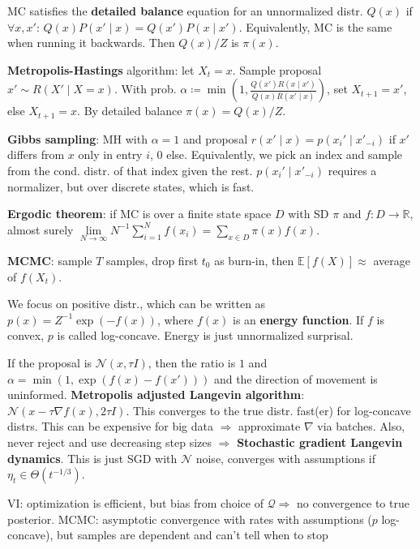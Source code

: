 \documentclass[11pt,landscape,a4paper,fleqn]{article}
\begin{document}
\begin{multicols*}{4}
MC satisfies the \textbf{detailed balance} equation for an unnormalized distr. \(Q(x)\) if \(\forall x, x'\):
\(Q(x)P(x' \mid x) = Q(x')P(x \mid x')\).
Equivalently, MC is the same when running it backwards.
Then \(Q(x) / Z\) is \(\pi(x)\).

\textbf{Metropolis-Hastings} algorithm: let \(X_t = x\).
Sample proposal \(x' \sim R(X' \mid X = x)\).
With prob. \(\alpha \coloneqq \min(1, \frac{Q(x')R(x \mid x')}{Q(x) R(x' \mid x)})\),
set \(X_{t+1} = x'\), else \(X_{t+1} = x\).
By detailed balance \(\pi(x) = Q(x) / Z\).

\textbf{Gibbs sampling}: MH with \(\alpha = 1\) and proposal
\(r(x' \mid x) = p(x_i' \mid x'_{ - i})\) if \(x'\) differs from \(x\) only in entry \(i\), 0 else.
Equivalently, we pick an index and sample from the cond. distr. of that index given the rest.
\(p(x_i' \mid x'_{ - i})\) requires a normalizer, but over discrete states, which is fast.

\textbf{Ergodic theorem}: if MC is over a finite state space \(D\) with SD \(\pi\) and \(f : D \to \mathbb{R}\),
almost surely \(\lim\limits_{N \to \infty} N^{-1} \sum_{i = 1}^N f(x_i) = \sum_{x \in D} \pi(x) f(x)\).

\textbf{MCMC}: sample \(T\) samples, drop first \(t_0\) as burn-in, then \(\mathbb{E}[f(X)] \approx\) average of \(f(X_t)\).

We focus on positive distr., which can be written as \(p(x) = Z^{-1} \exp( - f(x))\), where \(f(x)\) is an \textbf{energy function}.
If \(f\) is convex, \(p\) is called log-concave.
Energy is just unnormalized surprisal.

If the proposal is \(\mathcal{N}(x, \tau I)\), then the ratio is \(1\) and \(\alpha = \min(1, \exp(f(x) - f(x')))\)
and the direction of movement is uninformed.
\textbf{Metropolis adjusted Langevin algorithm}: \(\mathcal{N}(x - \tau \nabla f(x), 2\tau I)\).
This converges to the true distr. fast(er) for log-concave distrs.
This can be expensive for big data \( \Rightarrow \) approximate \(\nabla\) via batches.
Also, never reject and use decreasing step sizes \( \Rightarrow \) \textbf{Stochastic gradient Langevin dynamics}.
This is just SGD with \(\mathcal{N}\) noise, converges with assumptions if \(\eta_t \in \Theta(t^{ - 1 / 3})\).

VI: optimization is efficient, but bias from choice of \(\mathcal{Q} \Rightarrow\) no convergence to true posterior.
MCMC: asymptotic convergence with rates with assumptions (\(p\) log-concave), but samples are dependent and can't tell when to stop


\end{multicols*}
\end{document}
